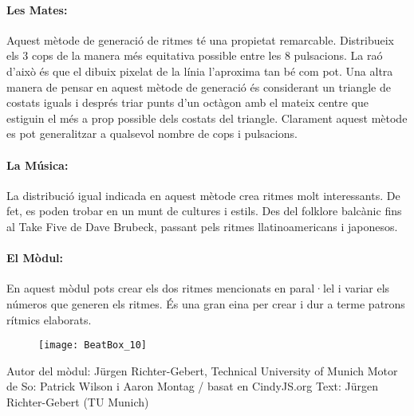 \paragraph{Les Mates:}
Aquest mètode de generació de ritmes té una propietat remarcable. Distribueix els 3 cops de la manera més equitativa possible entre les 8 pulsacions. La raó d'això és que el dibuix pixelat de la línia l'aproxima tan bé com pot. Una altra manera de pensar en aquest mètode de generació és considerant un triangle de costats iguals i després triar punts d'un octàgon amb el mateix centre que estiguin el més a prop possible dels costats del triangle. Clarament aquest mètode es pot generalitzar a qualsevol nombre de cops i pulsacions.

\paragraph{La Música:} La distribució igual indicada en aquest mètode crea ritmes molt interessants. De fet, es poden trobar en un munt de cultures i estils. Des del folklore balcànic fins al Take Five de Dave Brubeck, passant pels ritmes  llatinoamericans i japonesos.

\paragraph{El Mòdul:} En aquest mòdul pots crear els dos ritmes mencionats en paral·lel i variar els números que generen els ritmes. És una gran eina per crear i dur a terme patrons rítmics elaborats.

\begin{figure}[h]
\centering
\texttt{[image: BeatBox\_10]}
\end{figure}

\vfill

Autor del mòdul: Jürgen Richter-Gebert, Technical University of Munich
Motor de So: Patrick Wilson i Aaron Montag / basat en CindyJS.org
Text: Jürgen Richter-Gebert (TU Munich)
